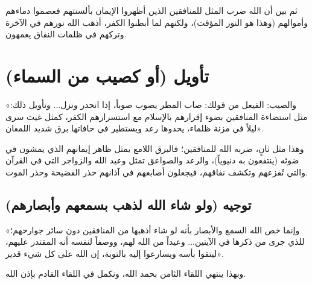 ثم بين أن الله ضرب المثل للمنافقين الذين أظهروا الإيمان بألسنتهم فعصموا دماءهم وأموالهم (وهذا هو النور المؤقت)، ولكنهم لما أبطنوا الكفر، أذهب الله نورهم في الآخرة وتركهم في ظلمات النفاق يعمهون.

\section{تأويل (أو كصيب من السماء)}
 «والصيب: الفيعل من قولك: صاب المطر يصوب صوباً، إذا انحدر ونزل... وتأويل ذلك: مثل استضاءة المنافقين بضوء إقرارهم بالإسلام مع استسرارهم الكفر، كمثل غيث سرى ليلاً في مزنة ظلماء، يحدوها رعد ويستطير في حافاتها برق شديد اللمعان».

وهذا مثل ثانٍ، ضربه الله للمنافقين؛ فالبرق اللامع يمثل ظاهر إيمانهم الذي يمشون في ضوئه (ينتفعون به دنيوياً)، والرعد والصواعق تمثل وعيد الله والزواجر التي في القرآن والتي تُفزعهم وتكشف نفاقهم، فيجعلون أصابعهم في آذانهم حذر الفضيحة وحذر الموت.

\subsection{توجيه (ولو شاء الله لذهب بسمعهم وأبصارهم)}
 «وإنما خص الله السمع والأبصار بأنه لو شاء أذهبها من المنافقين دون سائر جوارحهم؛ للذي جرى من ذكرها في الآيتين... وعيداً من الله لهم، ووصفاً لنفسه أنه المقتدر عليهم، ليتقوا بأسه ويسارعوا إليه بالتوبة، إن الله على كل شيء قدير».

وبهذا ينتهي اللقاء الثامن بحمد الله، ونكمل في اللقاء القادم بإذن الله.
